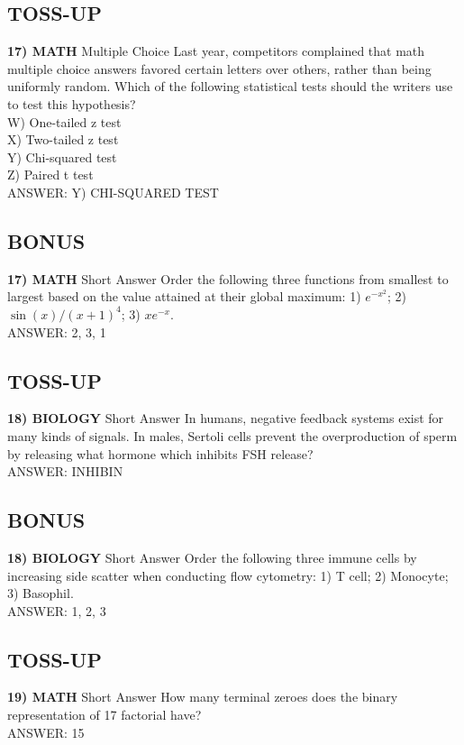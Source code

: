 \documentclass{article}
\begin{document}
\subsection*{TOSS-UP}
\textbf{17) MATH} Multiple Choice Last year, competitors complained that math multiple choice answers favored certain letters over others, rather than being uniformly random. Which of the following statistical tests should the writers use to test this hypothesis?
\\W) One-tailed z test
\\X) Two-tailed z test
\\Y) Chi-squared test
\\Z) Paired t test
\\ANSWER: Y) CHI-SQUARED TEST

\subsection*{BONUS}
\textbf{17) MATH} Short Answer Order the following three functions from smallest to largest based on the value attained at their global maximum: 1) $e^{-x^{2}}$; 2) $\sin(x)/(x+1)^{4}$; 3) $xe^{-x}$.
\\ANSWER: 2, 3, 1

\subsection*{TOSS-UP}
\textbf{18) BIOLOGY} Short Answer In humans, negative feedback systems exist for many kinds of signals. In males, Sertoli cells prevent the overproduction of sperm by releasing what hormone which inhibits FSH release?
\\ANSWER: INHIBIN

\subsection*{BONUS}
\textbf{18) BIOLOGY} Short Answer Order the following three immune cells by increasing side scatter when conducting flow cytometry: 1) T cell; 2) Monocyte; 3) Basophil.
\\ANSWER: 1, 2, 3

\subsection*{TOSS-UP}
\textbf{19) MATH} Short Answer How many terminal zeroes does the binary representation of 17 factorial have?
\\ANSWER: 15
\end{document}
